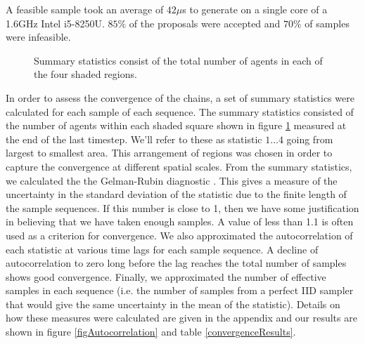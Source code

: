 \documentclass{article}
\begin{document}
A feasible sample took an average of $42\mu$s to generate on a single core of a 1.6GHz Intel i5-8250U. $85\%$ of the proposals were accepted and $70\%$ of samples were infeasible. 

\begin{figure}
	\centering
	\caption{Summary statistics consist of the total number of agents in each of the four shaded regions.}
	\label{figRegions}
\end{figure}
In order to assess the convergence of the chains, a set of summary statistics were calculated for each sample of each sequence. The summary statistics consisted of the number of agents within each shaded square shown in figure \ref{figRegions} measured at the end of the last timestep. We'll refer to these as statistic $1 \dots 4$ going from largest to smallest area. This arrangement of regions was chosen in order to capture the convergence at different spatial scales. From the summary statistics, we calculated the the Gelman-Rubin diagnostic \citep{gelman1992inference}. This gives a measure of the uncertainty in the standard deviation of the statistic due to the finite length of the sample sequences. If this number is close to 1, then we have some justification in believing that we have taken enough samples. A value of less than 1.1 is often used as a criterion for convergence. We also approximated the autocorrelation of each statistic at various time lags for each sample sequence. A decline of autocorrelation to zero long before the lag reaches the total number of samples shows good convergence. Finally, we approximated the number of effective samples in each sequence (i.e. the number of samples from a perfect IID sampler that would give the same uncertainty in the mean of the statistic). Details on how these measures were calculated are given in the appendix and our results are shown in figure \ref{figAutocorrelation} and table \ref{convergenceResults}.
\end{document}
